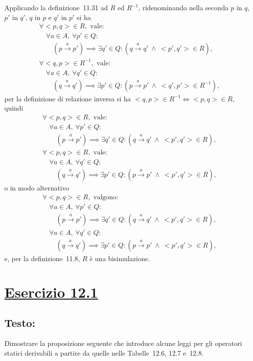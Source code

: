 \documentclass[a4paper,twosides]{report}
\newcommand{\sectionline}{
  \begin{center}
    \resizebox{0.5\linewidth}{5ex}{
      \hyperref[toc]{
        \begin{tikzpicture}
          \node  (C) at (0,0) {};
          \node (D) at (10,0) {};
          \path (C) to [ornament=84] (D);
        \end{tikzpicture}
      }
    }
  \end{center}
}
\begin{document}
Applicando la definizione~11.31 ad $R$ ed $R^{-1}$, ridenominando
nella seconda $p$
in $q$, $p'$ in $q'$, $q$ in $p$ e $q'$ in $p'$ si ha
\begin{align*}
&\forall <p,q>\in R,\text{ vale:}\\
&\quad\forall a\in A,\ \forall p'\in Q:\\
&\quad\quad(p\xrightarrow{a} p')\implies\exists q'\in Q:(q\xrightarrow{a} q'\
\land\ <p',q'>\in R),
\\
&\forall <q,p>\in R^{-1},\text{ vale:}\\
&\quad\forall a\in A,\ \forall q'\in Q:\\
&\quad\quad(q\xrightarrow{a} q')\implies\exists p'\in Q:(p\xrightarrow{a} p'\
\land\ <q',p'>\in R^{-1}),
\end{align*}
per la definizione di relazione inversa si ha
$<q,p>\in R^{-1}\iff<p,q>\in R$, quindi
\begin{align*}
&\forall <p,q>\in R,\text{ vale:}\\
&\quad\forall a\in A,\ \forall p'\in Q:\\
&\quad\quad(p\xrightarrow{a} p')\implies\exists q'\in Q:(q\xrightarrow{a} q'\
\land\ <p',q'>\in R),
\\
&\forall <p,q>\in R,\text{ vale:}\\
&\quad\forall a\in A,\ \forall q'\in Q:\\
&\quad\quad(q\xrightarrow{a} q')\implies\exists p'\in Q:(p\xrightarrow{a} p'\
\land\ <p',q'>\in R),
\end{align*}
o in modo alternativo
\begin{align*}
&\forall <p,q>\in R,\text{ valgono:}\\
&\quad\forall a\in A,\ \forall p'\in Q:\\
&\quad\quad(p\xrightarrow{a} p')\implies\exists q'\in Q:(q\xrightarrow{a} q'\
\land\ <p',q'>\in R),
\\
&\quad\forall a\in A,\ \forall q'\in Q:\\
&\quad\quad(q\xrightarrow{a} q')\implies\exists p'\in Q:(p\xrightarrow{a} p'\
\land\ <p',q'>\in R),
\end{align*}
e, per la definizione~11.8, $R$ \`e una bisimulazione.

\sectionline
\section*{\hyperref[toc]{Esercizio 12.1}}
\subsection*{Testo:}
Dimostrare la proposizione seguente che introduce alcune leggi per gli
operatori statici derivabili 
a partire da quelle nelle Tabelle~12.6, 12.7 e~12.8.
\end{document}
